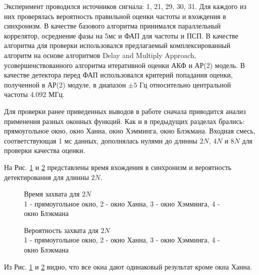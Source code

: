 Эксперимент проводился источников сигнала: 1, 21, 29, 30, 31. Для каждого из них проверялась вероятность правильной оценки частоты и вхождения в синхронизм.
В качестве базового алгоритма принимался параллельный коррелятор, осреднение фазы на 5мс и ФАП для частоты и ПСП. В качестве алгоритма для проверки
использовался предлагаемый комплексированный алгоритм на основе алгоритмов Delay and Multiply Approach, усовершенствованного алгоритма итеративной оценки АКФ и
АР(2) модель. В качестве детектора перед ФАП использовался критерий попадания оценки, полученной в АР(2) модуле, в диапазон ${\pm 5}$ Гц относительно
центральной частоты ${4.092}$ МГц. 

Для проверки ранее приведенных выводов в работе сначала приводится анализ применения разных оконных функций. Как и в предыдущих разделах брались: прямоугольное окно,
окно Ханна, окно Хэмминга, окно Блэкмана. Входная смесь, соответствующая 1 мс данных, дополнялась нулями до длинны ${2N}$, ${4N}$ и ${8N}$ для проверки качества оценки.

На Рис. \ref{pic:dma5mhz_2fft_lockTime} и \ref{pic:dma5mhz_2fft_probDetection} представлены время вхождения в синхронизм и вероятность детектирования для длинны ${2N}$.
\begin{figure}[h]
\center{}
	\caption{Время захвата для ${2N}$ \\ 1 - прямоугольное окно, 2 - окно Ханна, 3 - окно Хэмминга, 4 - окно Блэкмана}
	\label{pic:dma5mhz_2fft_lockTime}
\end{figure}
\begin{figure}[h]
\center{}
	\caption{Вероятность захвата для ${2N}$ \\ 1 - прямоугольное окно, 2 - окно Ханна, 3 - окно Хэмминга, 4 - окно Блэкмана}
	\label{pic:dma5mhz_2fft_probDetection}
\end{figure}
Из Рис. \ref{pic:dma5mhz_2fft_lockTime} и \ref{pic:dma5mhz_2fft_probDetection} видно, что все окна дают одинаковый результат кроме окна Ханна.

